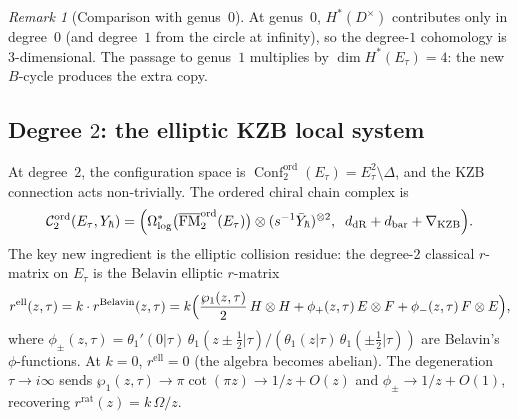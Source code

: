 \documentclass[11pt,reqno]{amsart}
\theoremstyle{definition}
\theoremstyle{remark}
\newtheorem{remark}[theorem]{Remark}
\newcommand{\cC}{\mathcal{C}}
\DeclareMathOperator{\Conf}{Conf}
\DeclareMathOperator{\FM}{FM}
\numberwithin{equation}{section}
\begin{document}
\begin{remark}[Comparison with genus~$0$]
At genus~$0$, $H^*(D^\times)$ contributes only in degree~$0$
(and degree~$1$ from the circle at infinity), so the
degree-$1$ cohomology is $3$-dimensional. The passage to
genus~$1$ multiplies by $\dim H^*(E_\tau) = 4$: the new
$B$-cycle produces the extra copy.
\end{remark}

\subsection{Degree $2$: the elliptic KZB local system}
\label{subsec:ell-degree2}

At degree~$2$, the configuration space is
$\Conf_2^{\mathrm{ord}}(E_\tau) = E_\tau^2 \setminus
\Delta$, and the KZB connection acts non-trivially.
The ordered chiral chain complex is
\begin{equation}\label{eq:ell-degree2-cx}
  \cC_2^{\mathrm{ord}}(E_\tau, Y_\hbar)
  = \Bigl(
  \Omega^*_{\log}\bigl(
  \overline{\FM}_2^{\mathrm{ord}}(E_\tau)\bigr)
  \otimes (s^{-1}\bar{Y}_\hbar)^{\otimes 2},
  \;\;
  d_{\mathrm{dR}} + d_{\mathrm{bar}}
  + \nabla_{\mathrm{KZB}}
  \Bigr).
\end{equation}
The key new ingredient is the elliptic collision residue:
the degree-$2$ classical $r$-matrix on $E_\tau$ is the
Belavin elliptic $r$-matrix
\begin{equation}\label{eq:belavin-r}
  r^{\mathrm{ell}}(z, \tau)
  = k \cdot r^{\mathrm{Belavin}}(z, \tau)
  = k \Bigl(
  \frac{\wp_1(z, \tau)}{2}\,H \otimes H
  + \phi_+(z, \tau)\,E \otimes F
  + \phi_-(z, \tau)\,F \otimes E
  \Bigr),
\end{equation}
where $\phi_\pm(z, \tau) = \theta_1'(0|\tau)\,
\theta_1(z \pm \tfrac{1}{2}|\tau) /
(\theta_1(z|\tau)\,\theta_1(\pm\tfrac{1}{2}|\tau))$
are Belavin's $\phi$-functions. At $k = 0$,
$r^{\mathrm{ell}} = 0$ (the algebra becomes abelian).
The degeneration
$\tau \to i\infty$ sends
$\wp_1(z, \tau) \to \pi\cot(\pi z) \to 1/z + O(z)$
and $\phi_\pm \to 1/z + O(1)$, recovering
$r^{\mathrm{rat}}(z) = k\,\Omega/z$.
\end{document}
